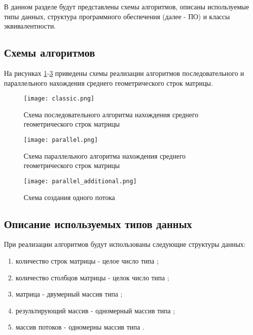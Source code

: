 В данном разделе будут представлены схемы алгоритмов, описаны используемые типы данных, структура программного обеспечения (далее - ПО) и классы эквивалентности.

\subsection{Схемы алгоритмов}

На рисунках \ref{fig:classic}-\ref{fig:parallel_additional} приведены схемы реализации алгоритмов последовательного и параллельного нахождения среднего геометрического строк матрицы.

\begin{figure}[h]
	\centering
	\texttt{[image: classic.png]}
	\caption{Схема последовательного алгоритма нахождения среднего геометрического строк матрицы}
	\label{fig:classic}
\end{figure}

\begin{figure}[h]
	\centering
	\texttt{[image: parallel.png]}
	\caption{Схема параллельного алгоритма нахождения среднего геометрического строк матрицы}
	\label{fig:parallel}
\end{figure}

\begin{figure}[h]
	\centering
	\texttt{[image: parallel\_additional.png]}
	\caption{Схема создания одного потока}
	\label{fig:parallel_additional}
\end{figure}

\clearpage

\subsection{Описание используемых типов данных}

При реализации алгоритмов будут использованы следующие структуры данных:
		
\begin{enumerate}
    \item количество строк матрицы - целое число типа ;
    \item количество столбцов матрицы - целок число типа ;
    \item матрица - двумерный массив типа ;
    \item результирующий массив - одномерный массив типа ;
    \item массив потоков - одномерны массив типа .
\end{enumerate}


